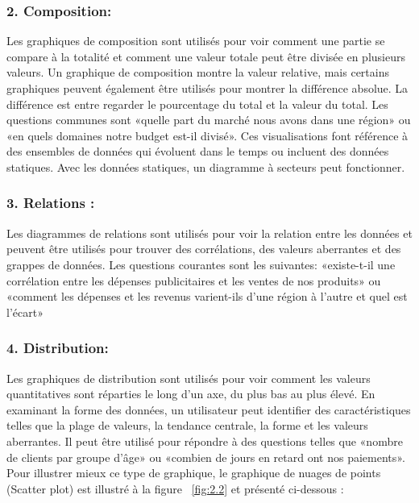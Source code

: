 \documentclass[french, a4paper, 12pt]{report}
\begin{document}
\subsubsection{2. Composition:}
Les graphiques de composition sont utilisés pour voir comment une partie se compare à la totalité et comment une valeur totale peut être divisée en plusieurs valeurs. Un graphique de composition montre la valeur relative, mais certains graphiques peuvent également être utilisés pour montrer la différence absolue. La différence est entre regarder le pourcentage du total et la valeur du total. Les questions communes sont «quelle part du marché nous avons dans une région» ou «en quels domaines notre budget est-il divisé».
Ces visualisations font référence à des ensembles de données qui évoluent dans le temps ou incluent des données statiques. Avec les données statiques, un diagramme à secteurs peut fonctionner.
\subsubsection{3. Relations : }
Les diagrammes de relations sont utilisés pour voir la relation entre les données et peuvent être utilisés pour trouver des corrélations, des valeurs aberrantes et des grappes de données. Les questions courantes sont les suivantes: «existe-t-il une corrélation entre les dépenses publicitaires et les ventes de nos produits» ou «comment les dépenses et les revenus varient-ils d’une région à l’autre et quel est l’écart»

\subsubsection{4. Distribution: }
Les graphiques de distribution sont utilisés pour voir comment les valeurs quantitatives sont réparties le long d'un axe, du plus bas au plus élevé. En examinant la forme des données, un utilisateur peut identifier des caractéristiques telles que la plage de valeurs, la tendance centrale, la forme et les valeurs aberrantes. Il peut être utilisé pour répondre à des questions telles que «nombre de clients par groupe d'âge» ou «combien de jours en retard ont nos paiements».
Pour illustrer mieux ce type de graphique, le graphique de nuages de points (Scatter plot) est illustré à la figure ~\ref{fig:2.2} et présenté ci-dessous :
\pagebreak
\end{document}
